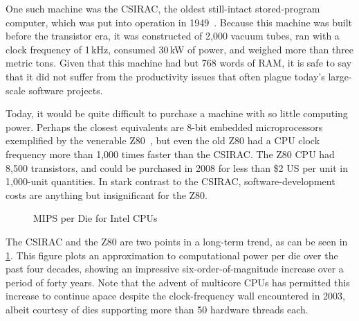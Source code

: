 One such machine was the CSIRAC, the oldest still-intact stored-program
computer, which was put into operation in
1949~\cite{CSIRACMuseumVictoria,CSIRACUniversityMelbourne}.
Because this machine was built before the transistor era, it was constructed
of 2,000 vacuum tubes, ran with a clock frequency of 1\,kHz,
consumed 30\,kW of power, and weighed more than three metric tons.
Given that this machine had but 768 words of RAM, it is safe to say that
it did not suffer from the productivity issues that often plague
today's large-scale software projects.

Today, it would be quite difficult to purchase a machine with so
little computing power.
Perhaps the closest equivalents
are 8-bit embedded microprocessors exemplified by the venerable
Z80~\cite{z80Wikipedia}, but even the old Z80 had a CPU clock
frequency more than 1,000 times faster than the CSIRAC\@.
The Z80 CPU had 8,500 transistors, and could be purchased in 2008
for less than \$2 US per unit in 1,000-unit quantities.
In stark contrast to the CSIRAC, software-development costs are
anything but insignificant for the Z80.

\begin{figure}
\centering
{}
\caption{MIPS per Die for Intel CPUs}
\label{fig:intro:MIPS per Die for Intel CPUs}
\end{figure}

The CSIRAC and the Z80 are two points in a long-term trend, as can be
seen in
\cref{fig:intro:MIPS per Die for Intel CPUs}.
This figure plots an approximation to computational power per die
over the past four decades, showing an impressive six-order-of-magnitude
increase over a period of forty years.
Note that the advent of multicore CPUs has permitted this increase to
continue apace despite the clock-frequency wall encountered in 2003,
albeit courtesy of dies supporting more than 50 hardware threads each.

